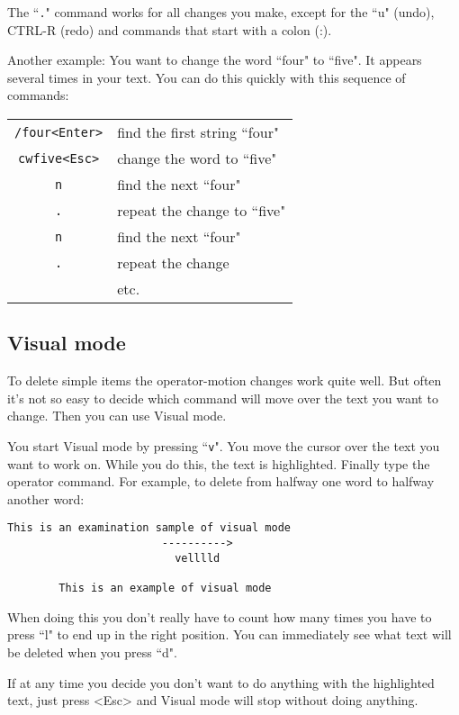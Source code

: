 The ``\texttt{.}" command works for all changes you make, except for the ``u" (undo),
CTRL-R (redo) and commands that start with a colon (:).

Another example: You want to change the word ``four" to ``five".
It appears several times in your text.
You can do this quickly with this sequence of commands:

\begin{center}
\begin{tabular}{c l}
				\texttt{/four<Enter>} & find the first string ``four"\\
				\texttt{cwfive<Esc>} & change the word to ``five"\\
				\texttt{n} & find the next ``four"\\
				\texttt{.} & repeat the change to ``five"\\
				\texttt{n} & find the next ``four"\\
				\texttt{.} & repeat the change\\
						& etc.
\end{tabular}
\end{center}

\subsection{Visual mode}

To delete simple items the operator-motion changes work quite well.
But often it's not so easy to decide which command will move over the text you want to change.
Then you can use Visual mode.

You start Visual mode by pressing ``\texttt{v}".
You move the cursor over the text you want to work on.
While you do this, the text is highlighted.
Finally type the operator command.
For example, to delete from halfway one word to halfway another word:

\begin{Verbatim}[samepage=true]
        This is an examination sample of visual mode 
                        ---------->
                          velllld

        This is an example of visual mode 
\end{Verbatim}

When doing this you don't really have to count how many times you have to press ``l" to end up in the right position.
You can immediately see what text will be deleted when you press ``d".

If at any time you decide you don't want to do anything with the highlighted text, just press <Esc> and Visual mode will stop without doing anything.
 
